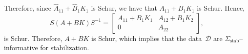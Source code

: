 \documentclass[9pt,shortpaper,twoside,web]{ieeecolor}
\DeclareMathOperator{\im}{im}
\begin{document}
Therefore, since $\hat{A}_{11}+\hat{B}_1K_1$ is Schur, we have that $A_{11}+B_1K_1$ is Schur. Hence,
\begin{equation}
S(A+BK)S^{-1}=\begin{bmatrix}
A_{11}+B_1K_1 & A_{12}+B_1K_2 \\
0 & A_{22}
\end{bmatrix},
\end{equation}
is Schur. Therefore, $A+BK$ is Schur, which implies that the \mbox{data $\mathcal{D}$} are $\Sigma_\text{stab}$--informative for stabilization.   \hfill \QED

\end{document}
